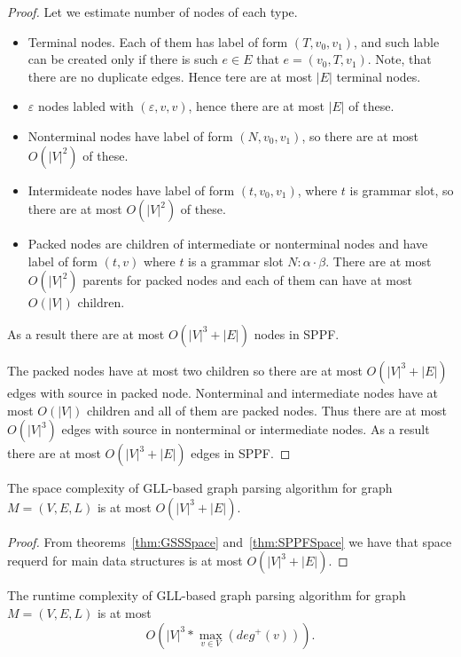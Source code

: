 \begin{proof}
Let we estimate number of nodes of each type.
\begin{itemize}
\item Terminal nodes. 
Each of them has label of form $(T, v_0, v_1)$, and such lable can be created only if there is such $e \in E$ that $e=(v_0,T,v_1)$. 
Note, that there are no duplicate edges. 
Hence tere are at most $|E|$ terminal nodes.
\item $\varepsilon$ nodes labled with $(\varepsilon, v ,v)$, hence there are at most $|E|$ of these. 
\item Nonterminal nodes have label of form $(N,v_0,v_1)$, so there are at most $O(|V|^2)$ of these.
\item Intermideate nodes have label of form $(t,v_0,v_1)$, where $t$ is grammar slot, so there are at most $O(|V|^2)$ of these.
\item Packed nodes are children of intermediate or nonterminal nodes and have label of form $(t,v)$ where $t$ is a grammar slot $N : \alpha \cdot \beta$.
There are at most $O(|V|^2)$ parents for packed nodes and each of them can have at most $O(|V|)$ children.
\end{itemize}

As a result there are at most $O(|V|^3 + |E|)$ nodes in SPPF.

The packed nodes have at most two children so there are at most $O(|V|^3 + |E|)$ edges with source in packed node. 
Nonterminal and intermediate nodes have at most $O(|V|)$ children and all of them are packed nodes.
Thus there are at most $O(|V|^3)$ edges with source in nonterminal or intermediate nodes. As a result there are at most $O(|V|^3 + |E|)$ edges in SPPF.


\end{proof}

\begin{mytheorem}
The space complexity of GLL-based graph parsing algorithm for graph $M=(V,E,L)$ is at most $O(|V|^3 + |E|)$.
\end{mytheorem}

\begin{proof}

From theorems~\ref{thm:GSSSpace} and~\ref{thm:SPPFSpace} we have that space requerd for main data structures is at most $O(|V|^3 + |E|)$. 

\end{proof}


\begin{mytheorem}\label{thm:complexity}
The runtime complexity of GLL-based graph parsing algorithm for graph $M=(V,E,L)$ is at most $$O\left(|V|^3*\max\limits_{v \in V}\left(deg^+\left(v\right)\right)\right).$$
\end{mytheorem}

